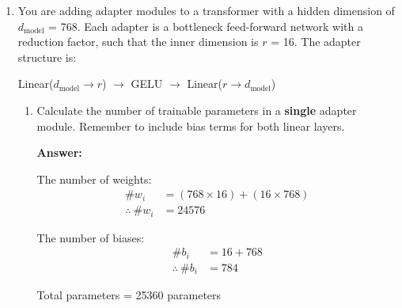 \documentclass[11pt]{article}
\begin{document}
\begin{enumerate}[label=(\alph*)]
    \item You are adding adapter modules to a transformer with a hidden dimension of \(d_\text{model}\) = 768.
    Each adapter is a bottleneck feed-forward network with a reduction factor, such that the inner dimension is \(r\) = 16. The adapter structure is:
    \begin{center}
        Linear(\(d_\text{model} \rightarrow r\)) \(\rightarrow\) GELU \(\rightarrow\) Linear(\(r \rightarrow d_\text{model}\))
    \end{center}

    \begin{center}
    \end{center}

    \begin{enumerate}[label=(\roman*)]
        \item Calculate the number of trainable parameters in a \textbf{single} adapter module.
        Remember to include bias terms for both linear layers.

        \textbf{Answer:}
        
        The number of weights:
        \begin{align*}
            \#w_i &= (768 \times 16) + (16 \times 768) \\
            \therefore \ \#w_i &= 24576
        \end{align*}

        The number of biases:
        \begin{align*}
            \#b_i &= 16 + 768 \\
            \therefore \ \#b_i &= 784
        \end{align*}

        Total parameters = 25360 parameters


\end{enumerate}
\end{enumerate}
\end{document}
